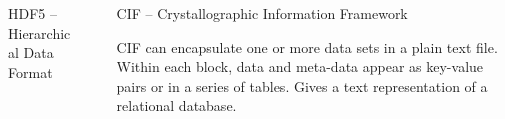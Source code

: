 \documentclass[final]{beamer}
\begin{document}
\begin{frame}{}
\begin{columns}[t]
\begin{column}{.31\linewidth}
\begin{block}{HDF5 -- Hierarchical Data Format}
        \end{block}
      \end{column}
      \begin{column}{.01\linewidth}
      \end{column}
      \begin{column}{.35\linewidth}
        \begin{block}{CIF -- Crystallographic Information Framework}

          \justifying CIF can encapsulate one or more data sets in a plain
          text file.  Within each block, data and meta-data appear as
          key-value pairs or in a series of tables.  Gives a text
          representation of a relational database.

         \vspace{2mm} {\ }


\end{block}
\end{column}
\end{columns}
\end{frame}
\end{document}
